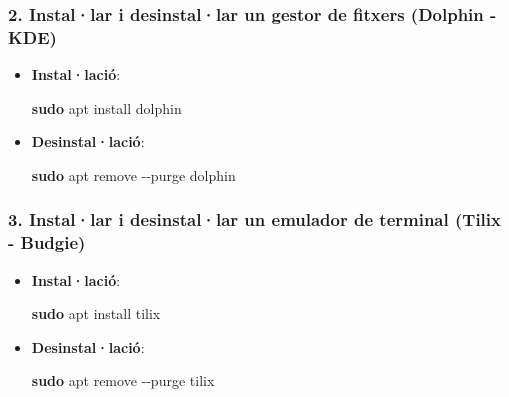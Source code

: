 \documentclass[
  a4paper,
]{article}
\newenvironment{Shaded}{\begin{snugshade}}{\end{snugshade}}
\newcommand{\AttributeTok}[1]{\textcolor[rgb]{0.13,0.29,0.53}{#1}}
\newcommand{\FunctionTok}[1]{\textcolor[rgb]{0.13,0.29,0.53}{\textbf{#1}}}
\newcommand{\NormalTok}[1]{#1}
\begin{document}
\subsubsection{\texorpdfstring{\textbf{2. Instal·lar i desinstal·lar un
gestor de fitxers (Dolphin -
KDE)}}{2. Instal·lar i desinstal·lar un gestor de fitxers (Dolphin - KDE)}}\label{installar-i-desinstallar-un-gestor-de-fitxers-dolphin---kde}

\begin{itemize}
\item
  \textbf{Instal·lació}:

\begin{Shaded}
\begin{Highlighting}[]
\FunctionTok{sudo}\NormalTok{ apt install dolphin}
\end{Highlighting}
\end{Shaded}
\item
  \textbf{Desinstal·lació}:

\begin{Shaded}
\begin{Highlighting}[]
\FunctionTok{sudo}\NormalTok{ apt remove }\AttributeTok{{-}{-}purge}\NormalTok{ dolphin}
\end{Highlighting}
\end{Shaded}
\end{itemize}

\subsubsection{\texorpdfstring{\textbf{3. Instal·lar i desinstal·lar un
emulador de terminal (Tilix -
Budgie)}}{3. Instal·lar i desinstal·lar un emulador de terminal (Tilix - Budgie)}}\label{installar-i-desinstallar-un-emulador-de-terminal-tilix---budgie}

\begin{itemize}
\item
  \textbf{Instal·lació}:

\begin{Shaded}
\begin{Highlighting}[]
\FunctionTok{sudo}\NormalTok{ apt install tilix}
\end{Highlighting}
\end{Shaded}
\item
  \textbf{Desinstal·lació}:

\begin{Shaded}
\begin{Highlighting}[]
\FunctionTok{sudo}\NormalTok{ apt remove }\AttributeTok{{-}{-}purge}\NormalTok{ tilix}
\end{Highlighting}
\end{Shaded}
\end{itemize}
\end{document}
